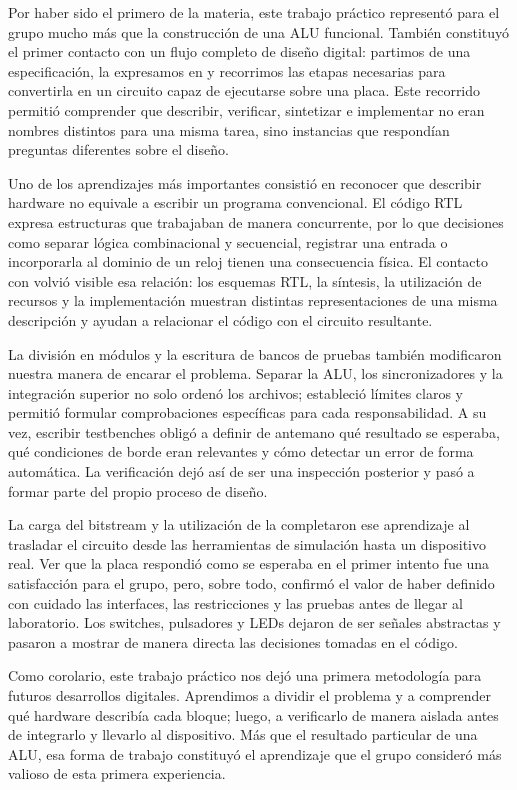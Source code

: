 Por haber sido el primero de la materia, este trabajo práctico
representó para el grupo mucho más que la construcción de una ALU
funcional. También constituyó el primer contacto con un flujo completo de diseño digital:
partimos de una especificación, la
expresamos en  y recorrimos las etapas necesarias
para convertirla en un circuito capaz de ejecutarse sobre una placa.
Este recorrido permitió comprender que describir, verificar, sintetizar
e implementar no eran nombres distintos para una misma tarea, sino
instancias que respondían preguntas diferentes sobre el diseño.

Uno de los aprendizajes más importantes consistió en reconocer que
describir hardware no equivale a escribir un programa convencional.
El código RTL expresa estructuras que trabajaban de manera concurrente,
por lo que decisiones como separar lógica combinacional y secuencial,
registrar una entrada o incorporarla al dominio de un reloj tienen una
consecuencia física. El contacto con  volvió visible esa
relación: los esquemas RTL, la síntesis, la utilización de recursos y
la implementación muestran distintas representaciones de una misma
descripción y ayudan a relacionar el código con el circuito resultante.

La división en módulos y la escritura de bancos de pruebas también
modificaron nuestra manera de encarar el problema. Separar la ALU, los
sincronizadores y la integración superior no solo ordenó los archivos;
estableció límites claros y permitió formular comprobaciones específicas
para cada responsabilidad. A su vez, escribir testbenches obligó a
definir de antemano qué resultado se esperaba, qué condiciones de borde
eran relevantes y cómo detectar un error de forma automática. La
verificación dejó así de ser una inspección posterior y pasó a formar
parte del propio proceso de diseño.

La carga del bitstream y la utilización de la  completaron
ese aprendizaje al trasladar el circuito desde las herramientas de
simulación hasta un dispositivo real. Ver que la placa respondió como
se esperaba en el primer intento fue una satisfacción para el grupo,
pero, sobre todo, confirmó el valor de haber definido con cuidado las
interfaces, las restricciones y las pruebas antes de llegar al
laboratorio. Los switches, pulsadores y LEDs dejaron de ser señales
abstractas y pasaron a mostrar de manera directa las decisiones tomadas
en el código.

Como corolario, este trabajo práctico nos dejó una primera metodología
para futuros desarrollos digitales. Aprendimos a dividir el problema y
a comprender qué hardware describía cada bloque; luego, a verificarlo
de manera aislada antes de integrarlo y llevarlo al dispositivo. Más que
el resultado particular de una ALU, esa forma de trabajo constituyó el
aprendizaje que el grupo consideró más valioso de esta primera
experiencia.
